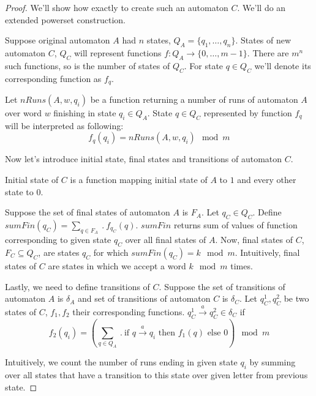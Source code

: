 \documentclass[12pt]{article}
\theoremstyle{definition}
\begin{document}
\begin{proof}
    We'll show how exactly to create such an automaton $C$. We'll do an extended powerset construction. 

    Suppose original automaton $A$ had $n$ states, $Q_A = \{q_1, \ldots, q_n\}$. States of new automaton $C$, $Q_C$ will represent functions $f: Q_A \rightarrow \{0, \ldots, m-1 \}$. There are $m^n$ such functions, so is the number of states of $Q_C$. For state $q \in Q_C$ we'll denote its corresponding function as $f_q$.
    
    Let $nRuns(A, w, q_i)$ be a function returning a number of runs of automaton $A$ over word $w$ finishing in state $q_i \in Q_A$. State $q \in Q_C$ represented by function $f_q$ will be interpreted as following:
    $$f_q(q_i) = nRuns(A, w, q_i) \mod m$$


    Now let's introduce initial state, final states and transitions of automaton $C$.

    Initial state of $C$ is a function mapping initial state of $A$ to $1$ and every other state to $0$.

    Suppose the set of final states of automaton $A$ is $F_A$. Let $q_C \in Q_C$. Define $sumFin(q_C) = \sum_{q \in F_A} \ . \ f_{q_C}(q)$. $sumFin$ returns sum of values of function corresponding to given state $q_C$ over all final states of $A$. Now, final states of $C$, $F_C \subseteq Q_C$, are states $q_C$ for which $sumFin(q_C) = k \mod m$. Intuitively, final states of $C$ are states in which we accept a word $k \mod m$ times.

    Lastly, we need to define transitions of $C$. Suppose the set of transitions of automaton $A$ is $\delta_A$ and set of transitions of automaton $C$ is $\delta_C$. Let $q_C^1, q_C^2$ be two states of $C$, $f_1, f_2$ their corresponding functions. $q_C^1 \xrightarrow{a} q_C^2 \in \delta_C$ if 
    $$f_2(q_i) = (\sum_{q \in Q_A} \ . \ \text{if } q \xrightarrow{a} q_i \text{ then } f_1(q) \text{ else } 0) \mod m$$

    Intuitively, we count the number of runs ending in given state $q_i$ by summing over all states that have a transition to this state over given letter from previous state.


\end{proof}
\end{document}
